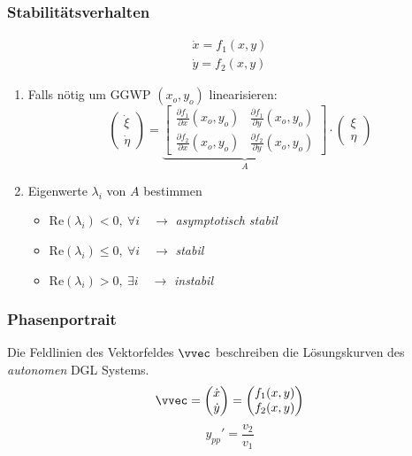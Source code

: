     \subsubsection{Stabilitätsverhalten}
        \vspace{-1em}
        \begin{align*}
            \dot{x} = f_1(x,y)\\
            \dot{y} = f_2(x,y)
        \end{align*}
        \vspace{-0.75em}
        \begin{enumerate}
            \item Falls nötig um GGWP $(x_o,y_o)$ linearisieren:
                  $$
                    \begin{pmatrix}
                        \dot{\xi}\\[0.5em] \dot{\eta}
                    \end{pmatrix}
                    =
                    \underbrace{\begin{bmatrix}
                        \frac{\partial f_1}{\partial x}(x_o, y_o) & \frac{\partial f_1}{\partial y}(x_o, y_o)\\[0.5em]
                        \frac{\partial f_2}{\partial x}(x_o, y_o) & \frac{\partial f_2}{\partial y}(x_o, y_o)
                    \end{bmatrix}}_{A}
                    \cdot 
                    \begin{pmatrix}
                        \xi\\[0.5em] \eta
                    \end{pmatrix}
                  $$
            \item Eigenwerte $\lambda_i$ von $A$ bestimmen
            \begin{itemize}
                \item Re$(\lambda_i) < 0, \ \forall i \quad \to $ \textit{asymptotisch stabil}
                \item Re$(\lambda_i) \leq 0, \ \forall i \quad \to $ \textit{stabil}
                \item Re$(\lambda_i) > 0, \ \exists i \quad \to $ \textit{instabil}
            \end{itemize}
        \end{enumerate}
    \subsubsection{Phasenportrait}
        Die Feldlinien des Vektorfeldes $\vvec$ beschreiben die Lösungskurven des \textit{autonomen} DGL Systems.
        $$
            \vvec =
            \begin{pmatrix}
                \dot{x}\\ \dot{y}
            \end{pmatrix}
            =
            \begin{pmatrix}
                f_1(x,y)\\f_2(x,y)
            \end{pmatrix}
        $$
        \vspace{0.5em}
        $$
            y_{pp}' = \frac{v_2}{v_1}
        $$  